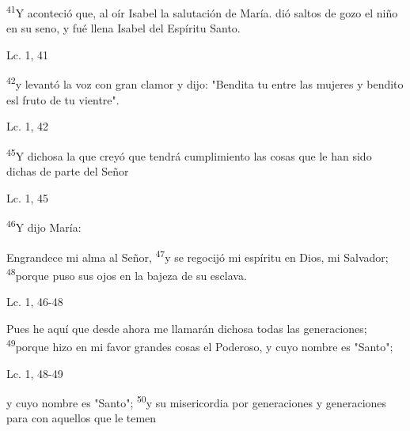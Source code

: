 \documentclass[a4paper,11pt]{article}
\begin{document}
      \textsuperscript{41}Y aconteció que, al oír Isabel la salutación de María. dió saltos de gozo el niño en su seno, y fué llena Isabel del Espíritu Santo.
      \begin{center}
        Lc. 1, 41        
      \end{center}
      
      \textsuperscript{42}y levantó la voz con gran clamor y dijo: "Bendita tu entre las mujeres y bendito esl fruto de tu vientre".

      \begin{center}
        Lc. 1, 42         
      \end{center}
      
      \textsuperscript{45}Y dichosa la que creyó que tendrá cumplimiento las cosas que le han sido dichas de parte del Señor
      \begin{center}
        Lc. 1, 45         
      \end{center}
      
      \textsuperscript{46}Y dijo María:
      \begin{center}
        Engrandece mi alma al Señor, \newline
        \textsuperscript{47}y se regocijó mi espíritu en Dios, mi Salvador; \newline
        \textsuperscript{48}porque puso sus ojos en la bajeza de su esclava.
      \end{center}

      \begin{center}
        Lc. 1, 46-48        
      \end{center}

      \begin{center}
        Pues he aquí que desde ahora \newline
        me llamarán dichosa todas las generaciones;\newline
        \textsuperscript{49}porque hizo en mi favor grandes cosas el Poderoso,
        y cuyo nombre es "Santo";
      \end{center}

      \begin{center}
        Lc. 1, 48-49          
      \end{center}
      
      \begin{center}
        y cuyo nombre es "Santo"; \newline
        \textsuperscript{50}y su misericordia por generaciones y generaciones \newline
        para con aquellos que le temen
      \end{center}
\end{document}
